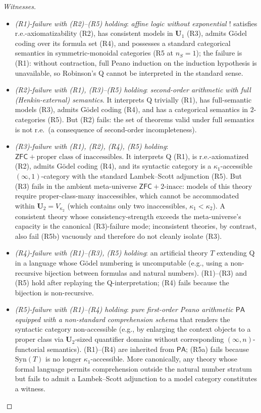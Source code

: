 \documentclass[11pt]{article}
\theoremstyle{plain}
\theoremstyle{definition}
\newcommand{\Syn}{\mathrm{Syn}}
\newcommand{\ZFC}{\mathsf{ZFC}}
\begin{document}
\begin{proof}[Witnesses]
\begin{itemize}[nosep]
\item \emph{(R1)-failure with (R2)--(R5) holding}: \emph{affine logic without exponential $!$} satisfies r.e.-axiomatizability (R2), has consistent models in $\mathbf{U}_1$ (R3), admits G\"odel coding over its formula set (R4), and possesses a standard categorical semantics in symmetric-monoidal categories (R5 at $n_S = 1$); the failure is (R1): without contraction, full Peano induction on the induction hypothesis is unavailable, so Robinson's Q cannot be interpreted in the standard sense.
\item \emph{(R2)-failure with (R1), (R3)--(R5) holding}: \emph{second-order arithmetic with full (Henkin-external) semantics}. It interprets Q trivially (R1), has full-semantic models (R3), admits G\"odel coding (R4), and has a categorical semantics in $2$-categories (R5). But (R2) fails: the set of theorems valid under full semantics is not r.e.\ (a consequence of second-order incompleteness).
\item \emph{(R3)-failure with (R1), (R2), (R4), (R5) holding}: \emph{$\ZFC + \text{proper class of inaccessibles}$}. It interprets Q (R1), is r.e.-axiomatized (R2), admits G\"odel coding (R4), and its syntactic category is a $\kappa_1$-accessible $(\infty, 1)$-category with the standard Lambek--Scott adjunction (R5). But (R3) fails in the ambient meta-universe $\ZFC + 2\text{-inacc}$: models of this theory require proper-class-many inaccessibles, which cannot be accommodated within $\mathbf{U}_2 = V_{\kappa_2}$ (which contains only two inaccessibles, $\kappa_1 < \kappa_2$). A consistent theory whose consistency-strength exceeds the meta-universe's capacity is the canonical (R3)-failure mode; inconsistent theories, by contrast, also fail (R5b) vacuously and therefore do not cleanly isolate (R3).
\item \emph{(R4)-failure with (R1)--(R3), (R5) holding}: an artificial theory $T$ extending Q in a language whose G\"odel numbering is uncomputable (e.g., using a non-recursive bijection between formulas and natural numbers). (R1)--(R3) and (R5) hold after replaying the Q-interpretation; (R4) fails because the bijection is non-recursive.
\item \emph{(R5)-failure with (R1)--(R4) holding}: \emph{pure first-order Peano arithmetic $\mathsf{PA}$ equipped with a non-standard comprehension schema} that renders the syntactic category non-accessible (e.g., by enlarging the context objects to a proper class via $\mathbf{U}_2$-sized quantifier domains without corresponding $(\infty, n)$-functorial semantics). (R1)--(R4) are inherited from $\mathsf{PA}$; (R5a) fails because $\Syn(T)$ is no longer $\kappa_1$-accessible. More canonically, any theory whose formal language permits comprehension outside the natural number stratum but fails to admit a Lambek--Scott adjunction to a model category constitutes a witness.
\end{itemize}
\end{proof}
\end{document}
